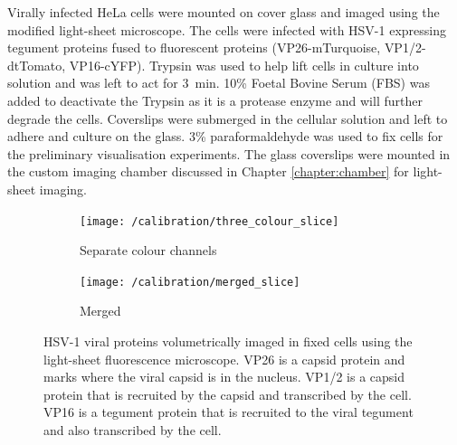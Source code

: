 Virally infected HeLa cells were mounted on cover glass and imaged using the modified light-sheet microscope.
The cells were infected with HSV-1 expressing tegument proteins fused to fluorescent proteins (\gls{VP26}-mTurquoise, \gls{VP1/2}-dtTomato, \gls{VP16}-cYFP).
Trypsin was used to help lift cells in culture into solution and was left to act for \SI{3}{\minute}.
10\% Foetal Bovine Serum (FBS) was added to deactivate the Trypsin as it is a protease enzyme and will further degrade the cells.
Coverslips were submerged in the cellular solution and left to adhere and culture on the glass.
3\% paraformaldehyde was used to fix cells for the preliminary visualisation experiments.
The glass coverslips were mounted in the custom imaging chamber discussed in Chapter \ref{chapter:chamber} for light-sheet imaging.


\begin{figure}
	\centering
	\begin{subfigure}[b]{0.7\linewidth}
    \centering
    \texttt{[image: /calibration/three\_colour\_slice]}
    \caption{Separate colour channels}
    \label{fig:merged_slice}
	\end{subfigure}
	\begin{subfigure}[b]{0.2\linewidth}
    \centering
    \texttt{[image: /calibration/merged\_slice]}
    \caption{Merged}
    \label{fig:three_colour_slice}
	\end{subfigure}
	\caption{
    \gls{HSV}-1 viral proteins volumetrically imaged in fixed cells using the light-sheet fluorescence microscope.
    \gls{VP26} is a capsid protein and marks where the viral capsid is in the nucleus.
    \gls{VP1/2} is a capsid protein that is recruited by the capsid and transcribed by the cell.
    \gls{VP16} is a tegument protein that is recruited to the viral tegument and also transcribed by the cell.
    }
	\label{fig:virus_image}
\end{figure}


